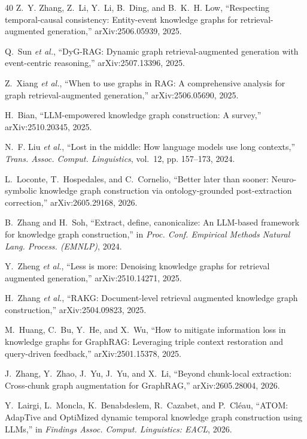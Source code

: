 \begin{thebibliography}{40}
Z.~Y. Zhang, Z.~Li, Y.~Li, B.~Ding, and B.~K.~H. Low, ``Respecting
temporal-causal consistency: Entity-event knowledge graphs for
retrieval-augmented generation,'' arXiv:2506.05939, 2025.

Q.~Sun \emph{et al.}, ``DyG-RAG: Dynamic graph retrieval-augmented
generation with event-centric reasoning,'' arXiv:2507.13396, 2025.

Z.~Xiang \emph{et al.}, ``When to use graphs in RAG: A comprehensive
analysis for graph retrieval-augmented generation,'' arXiv:2506.05690,
2025.

H.~Bian, ``LLM-empowered knowledge graph construction: A survey,''
arXiv:2510.20345, 2025.

N.~F. Liu \emph{et al.}, ``Lost in the middle: How language models use
long contexts,'' \emph{Trans. Assoc. Comput. Linguistics}, vol.~12, pp.
157--173, 2024.

L.~Loconte, T.~Hospedales, and C.~Cornelio, ``Better later than sooner:
Neuro-symbolic knowledge graph construction via ontology-grounded
post-extraction correction,'' arXiv:2605.29168, 2026.

B.~Zhang and H.~Soh, ``Extract, define, canonicalize: An LLM-based
framework for knowledge graph construction,'' in \emph{Proc. Conf.
Empirical Methods Natural Lang. Process. (EMNLP)}, 2024.

Y.~Zheng \emph{et al.}, ``Less is more: Denoising knowledge graphs for
retrieval augmented generation,'' arXiv:2510.14271, 2025.

H.~Zhang \emph{et al.}, ``RAKG: Document-level retrieval augmented
knowledge graph construction,'' arXiv:2504.09823, 2025.

M.~Huang, C.~Bu, Y.~He, and X.~Wu, ``How to mitigate information loss in
knowledge graphs for GraphRAG: Leveraging triple context restoration and
query-driven feedback,'' arXiv:2501.15378, 2025.

J.~Zhang, Y.~Zhao, J.~Yu, J.~Yu, and X.~Li, ``Beyond chunk-local
extraction: Cross-chunk graph augmentation for GraphRAG,''
arXiv:2605.28004, 2026.

Y.~Lairgi, L.~Moncla, K.~Benabdeslem, R.~Cazabet, and P.~Cl\'eau,
``ATOM: AdapTive and OptiMized dynamic temporal knowledge graph
construction using LLMs,'' in \emph{Findings Assoc. Comput. Linguistics:
EACL}, 2026.


\end{thebibliography}
